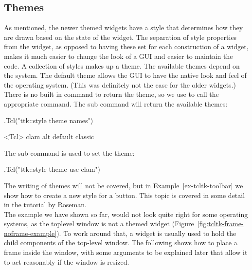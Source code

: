 \subsection{Themes}
\label{sec:tcltk:overview:themes}


As mentioned, the newer themed widgets have a style that determines
how they are drawn based on the state of the widget. The separation of
style properties from the widget, as opposed to having these set for
each construction of a widget, makes it much easier to change the look
of a GUI and easier to maintain the code. A collection of styles makes
up a theme. The available themes depend on the system. The default
theme allows the GUI to have the native look and feel of the operating
system. (This was definitely not the case for the older \TK\/
widgets.) There is no built in command to return the theme, so we use
 to call the appropriate \TCL\/ command. The 
sub command will return the available themes:

\begin{Schunk}
\begin{Sinput}
 .Tcl("ttk::style theme names")
\end{Sinput}
\begin{Soutput}
<Tcl> clam alt default classic 
\end{Soutput}
\end{Schunk}
%
The  sub command is used to set the theme:
\begin{Schunk}
\begin{Sinput}
 .Tcl("ttk::style theme use clam")
\end{Sinput}
\end{Schunk}

The writing of themes will not be covered, but in
Example~\ref{ex-tcltk-toolbar} we show how to create a new style for a
button. This topic is covered in some detail in the \Tk\/ tutorial by Roseman.
\\

The example we have shown so far, would not look quite right for some
operating systems, as the toplevel window is not a themed widget
(Figure~\ref{fig:tcltk-frame-noframe-example}). To work around that, a
 widget is usually used to hold the child
components of the top-level window. The following shows how to place a
frame inside the window, with some arguments to be explained later
that allow it to act reasonably if the window is resized.

